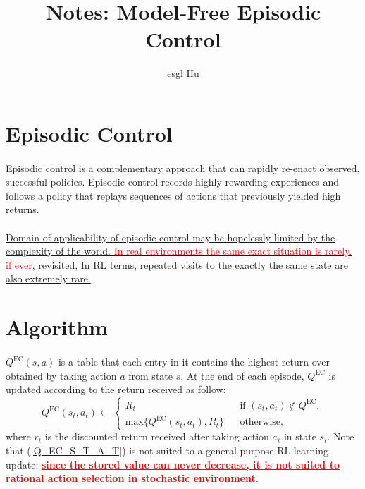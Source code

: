 \documentclass[12pt,a4paper]{article}
\begin{document}
\title{Notes: Model-Free Episodic Control\cite{Blundell2016Model}}
\author{esgl Hu}
\maketitle

\section{Episodic Control}
\paragraph{}Episodic control is a complementary approach that can rapidly re-enact observed, successful policies. Episodic control records highly rewarding experiences and follows a policy that replays sequences of actions that previously yielded high returns.

\paragraph{} \uline{Domain of applicability of episodic control may be hopelessly limited by the complexity of the world. \textcolor{red}{In real environments the same exact situation is rarely. if ever}, revisited, In RL terms, repeated visits to the exactly the same state are also extremely rare.}

\section{Algorithm}
\paragraph{}$Q^{\text{EC}}(s,a)$ is a table that each entry in it contains the highest return over obtained by taking action $a$ from state $s$. At the end of each episode, $Q^{\text{EC}}$ is updated according to the return received as follow:
\begin{equation}\label{Q_EC_S_T_A_T}
Q^{\text{EC}}(s_{t}, a_{t}) \leftarrow \left\lbrace
\begin{array}{lcl}
R_{t}                            & & \text{if } (s_{t}, a_{t}) \notin Q^{\text{EC}},\\
\text{max}\{Q^{\text{EC}}(s_{t}, a_{t}), R_{t}\} & & \text{otherwise},
\end{array}\right.
\end{equation}
where $r_{t}$ is the discounted return received after taking action $a_{t}$ in state $s_{t}$. Note that (\ref{Q_EC_S_T_A_T}) is not suited to a general purpose RL learning update: \textbf{\textcolor{red}{\uline{since the stored value can never decrease, it is not suited to rational action selection in stochastic environment. }}}
\end{document}
